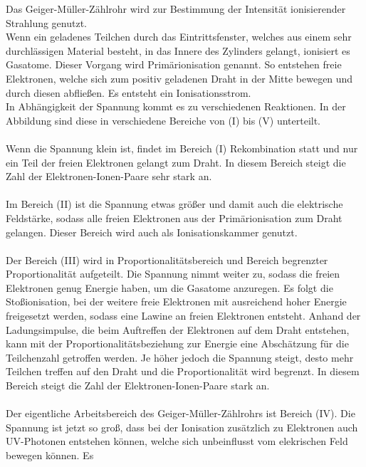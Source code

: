     Das Geiger-Müller-Zählrohr wird zur Bestimmung der Intensität ionisierender Strahlung genutzt.\\
    Wenn ein geladenes Teilchen durch das Eintrittsfenster, welches aus einem sehr durchlässigen Material
    besteht, in das Innere des Zylinders gelangt, ionisiert es Gasatome. Dieser Vorgang
    wird Primärionisation genannt. So entstehen freie Elektronen, welche sich zum positiv geladenen Draht 
    in der Mitte bewegen und durch diesen abfließen. Es entsteht ein Ionisationsstrom. \\
    In Abhängigkeit der Spannung kommt es zu verschiedenen Reaktionen. In der 
    Abbildung sind diese in verschiedene Bereiche von (I) bis (V) unterteilt.\\
    \\
    Wenn die Spannung klein ist, findet im Bereich (I) Rekombination statt und nur ein Teil der freien
    Elektronen gelangt zum Draht. In diesem Bereich steigt die Zahl der Elektronen-Ionen-Paare
    sehr stark an.\\
    \\
    Im Bereich (II) ist die Spannung etwas größer und damit auch die elektrische Feldstärke,
    sodass alle freien Elektronen aus der Primärionisation zum Draht gelangen. 
    Dieser Bereich wird auch als Ionisationskammer genutzt.\\
    \\
    Der Bereich (III) wird in Proportionalitätsbereich und Bereich begrenzter Proportionalität aufgeteilt.
    Die Spannung nimmt weiter zu, sodass die freien Elektronen genug Energie haben, um die Gasatome
    anzuregen. Es folgt die Stoßionisation, bei der weitere freie 
    Elektronen mit ausreichend hoher Energie freigesetzt werden, sodass eine Lawine 
    an freien Elektronen entsteht.
    Anhand der Ladungsimpulse, die beim Auftreffen der Elektronen auf dem Draht entstehen, kann
    mit der Proportionalitätsbeziehung zur Energie eine Abschätzung für die Teilchenzahl 
    getroffen werden. Je höher jedoch die Spannung steigt, desto mehr Teilchen treffen auf den Draht
    und die Proportionalität wird begrenzt. In diesem Bereich steigt die Zahl der Elektronen-Ionen-Paare
    stark an.\\
    \\
    Der eigentliche Arbeitsbereich des Geiger-Müller-Zählrohrs ist Bereich (IV). Die Spannung 
    ist jetzt so groß, dass bei der Ionisation zusätzlich zu Elektronen auch UV-Photonen
    entstehen können, welche sich unbeinflusst vom elekrischen Feld bewegen können. Es 
